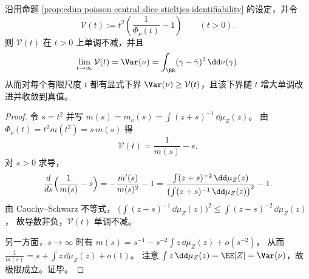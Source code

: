 \begin{proposition}\label{prop:cdim-poisson-variance-monotone-lower-bound}
沿用命题 \ref{prop:cdim-poisson-central-slice-stieltjes-identifiability} 的设定，并令
\[
\mathcal V(t):=t^2\left(\frac{1}{\Phi_\nu(t)}-1\right)
\qquad(t>0).
\]
则 \(\mathcal V(t)\) 在 \(t>0\) 上单调不减，并且
\[
\lim_{t\to\infty}\mathcal V(t)=\Var(\nu)=\int_{\RR}(\gamma-\bar\gamma)^2\,\dd\nu(\gamma).
\]
从而对每个有限尺度 \(t\) 都有显式下界 \(\Var(\nu)\ge \mathcal V(t)\)，且该下界随 \(t\) 增大单调改进并收敛到真值。
\end{proposition}
\begin{proof}
令 \(s=t^2\) 并写 \(m(s)=m_\nu(s)=\int(z+s)^{-1}\,\dd\mu_Z(z)\)。
由 \(\Phi_\nu(t)=t^2 m(t^2)=s\,m(s)\) 得
\[
\mathcal V(t)=\frac{1}{m(s)}-s.
\]
对 \(s>0\) 求导，
\[
\frac{d}{ds}\Bigl(\frac{1}{m(s)}-s\Bigr)
=-\frac{m'(s)}{m(s)^2}-1
=\frac{\int (z+s)^{-2}\,\dd\mu_Z(z)}{\bigl(\int (z+s)^{-1}\,\dd\mu_Z(z)\bigr)^2}-1.
\]
由 Cauchy--Schwarz 不等式，
\(
\bigl(\int (z+s)^{-1}\,\dd\mu_Z(z)\bigr)^2\le \int (z+s)^{-2}\,\dd\mu_Z(z)
\)，
故导数非负，\(\mathcal V(t)\) 单调不减。
\par
另一方面，\(s\to\infty\) 时有
\(
m(s)=s^{-1}-s^{-2}\int z\,\dd\mu_Z(z)+o(s^{-2})
\)，
从而
\(
\frac{1}{m(s)}=s+\int z\,\dd\mu_Z(z)+o(1)
\)。
注意 \(\int z\,\dd\mu_Z(z)=\EE[Z]=\Var(\nu)\)，故极限成立。证毕。
\end{proof}










\endinput
